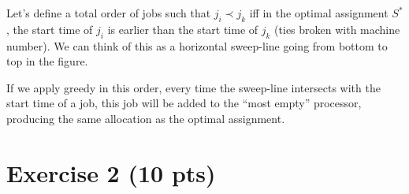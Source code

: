 \documentclass[a4paper]{article}
\begin{document}
\begin{figure}[h]
\centering
{}
\end{figure}

Let's define a total order of jobs such that $j_i \prec j_k$ iff in the optimal assignment $S^\ast$, the start time of $j_i$ is earlier than the start time of $j_k$ (ties broken with machine number). We can think of this as a horizontal sweep-line going from bottom to top in the figure.

If we apply greedy in this order, every time the sweep-line intersects with the start time of a job, this job will be added to the ``most empty'' processor, producing the same allocation as the optimal assignment.


\section*{Exercise 2 (10 pts)}
\end{document}
